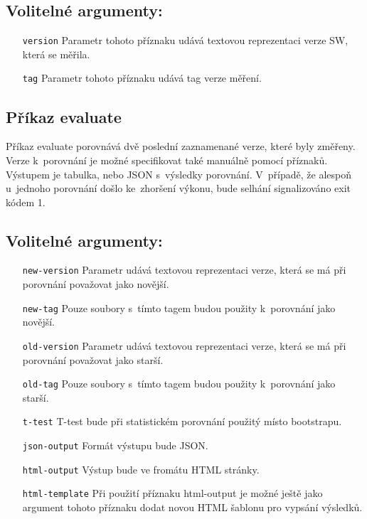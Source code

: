 \subsection*{Volitelné argumenty:}
\begin{itemize}[label=\texttt{\textbf{\textendash}}]
    \item[\texttt{version}] Parametr tohoto příznaku udává textovou reprezentaci verze SW, která se měřila.
    \item[\texttt{tag}] Parametr tohoto příznaku udává tag verze měření.
\end{itemize}

\subsection{Příkaz evaluate}

Příkaz evaluate porovnává dvě poslední zaznamenané verze, které byly změřeny.
Verze k~porovnání je možné specifikovat také manuálně pomocí příznaků. Výstupem
je tabulka, nebo JSON s~výsledky porovnání. V~případě, že alespoň u~jednoho porovnání
došlo ke~zhoršení výkonu, bude selhání signalizováno exit kódem 1.

\subsection*{Volitelné argumenty:}
\begin{itemize}[label=\texttt{\textbf{\textendash}}]
    \item[\texttt{new-version}] Parametr udává textovou reprezentaci verze, která se má při porovnání považovat jako novější.
    \item[\texttt{new-tag}]     Pouze soubory s~tímto tagem budou použity k~porovnání jako novější.
    \item[\texttt{old-version}] Parametr udává textovou reprezentaci verze, která se má při porovnání považovat jako starší.
    \item[\texttt{old-tag}]     Pouze soubory s~tímto tagem budou použity k~porovnání jako starší.
    \item[\texttt{t-test}]      T-test bude při statistickém porovnání použitý místo bootstrapu.
    \item[\texttt{json-output}] Formát výstupu bude JSON.
    \item[\texttt{html-output}] Výstup bude ve fromátu HTML stránky.
    \item[\texttt{html-template}] Při použití příznaku html-output je možné ještě jako argument tohoto příznaku dodat novou HTML šablonu pro vypsání výsledků.
\end{itemize}

